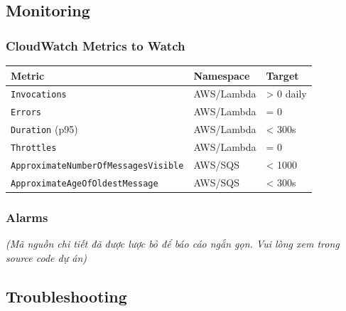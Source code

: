 \hypertarget{monitoring}{%
\subsection{Monitoring}}

\hypertarget{cloudwatch-metrics-to-watch}{%
\subsubsection{CloudWatch Metrics to
Watch}}

\begingroup
\small
\setlength{\tabcolsep}{3pt}
\renewcommand{\arraystretch}{1.15}
\begin{longtable}[]{@{}lll@{}}
\toprule\noalign{}
Metric & Namespace & Target \\
\midrule\noalign{}
\endhead
\bottomrule\noalign{}
\endlastfoot
\texttt{Invocations} & AWS/Lambda & \textgreater{} 0 daily \\
\texttt{Errors} & AWS/Lambda & = 0 \\
\texttt{Duration} (p95) & AWS/Lambda & \textless{} 300s \\
\texttt{Throttles} & AWS/Lambda & = 0 \\
\texttt{ApproximateNumberOfMessagesVisible} & AWS/SQS & \textless{}
1000 \\
\texttt{ApproximateAgeOfOldestMessage} & AWS/SQS & \textless{} 300s \\
\end{longtable}
\endgroup

\hypertarget{alarms}{%
\subsubsection{Alarms}}

\emph{(Mã nguồn chi tiết đã được lược bỏ để báo cáo ngắn gọn. Vui lòng
xem trong source code dự án)}

\hypertarget{troubleshooting}{%
\subsection{Troubleshooting}}

